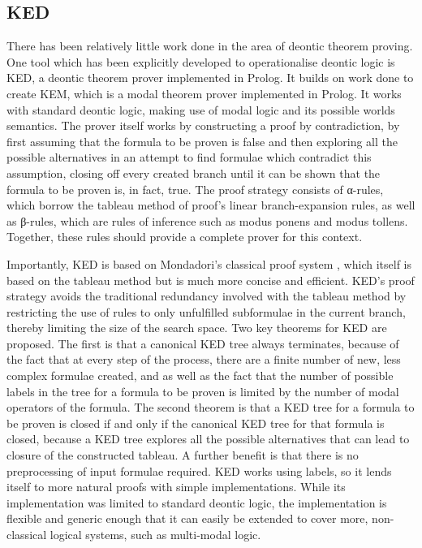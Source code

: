 \documentclass{l4proj}
\begin{document}

\subsection{KED}
There has been relatively little work done in the area of deontic theorem proving. One tool which has been explicitly developed to operationalise deontic logic is KED\cite{KED}, a deontic theorem prover implemented in Prolog. It builds on work done to create KEM\cite{KEM}, which is a modal theorem prover implemented in Prolog. It works with standard deontic logic, making use of modal logic and its possible worlds semantics\cite{sep-possible-worlds}. The prover itself works by constructing a proof by contradiction, by first assuming that the formula to be proven is false and then exploring all the possible alternatives in an attempt to find formulae which contradict this assumption, closing off every created branch until it can be shown that the formula to be proven is, in fact, true. The proof strategy consists of α-rules, which borrow the tableau method of proof's linear branch-expansion rules, as well as β-rules, which are rules of inference such as modus ponens and modus tollens. Together, these rules should provide a complete prover for this context. 

Importantly, KED is based on Mondadori's classical proof system \cite{Mondadori}, which itself is based on the tableau method but is much more concise and efficient. KED's proof strategy avoids the traditional redundancy involved with the tableau method by restricting the use of rules to only unfulfilled subformulae in the current branch, thereby limiting the size of the search space. Two key theorems for KED are proposed. The first is that a canonical KED tree always terminates, because of the fact that at every step of the process, there are a finite number of new, less complex formulae created, and as well as the fact that the number of possible labels in the tree for a formula to be proven is limited by the number of modal operators of the formula. The second theorem is that a KED tree for a formula to be proven is closed if and only if the canonical KED tree for that formula is closed, because a KED tree explores all the possible alternatives that can lead to closure of the constructed tableau. A further benefit is that there is no preprocessing of input formulae required. KED works using labels, so it lends itself to more natural proofs with simple implementations. While its implementation was limited to standard deontic logic, the implementation is flexible and generic enough that it can easily be extended to cover more, non-classical logical systems, such as multi-modal logic. 
\end{document}
